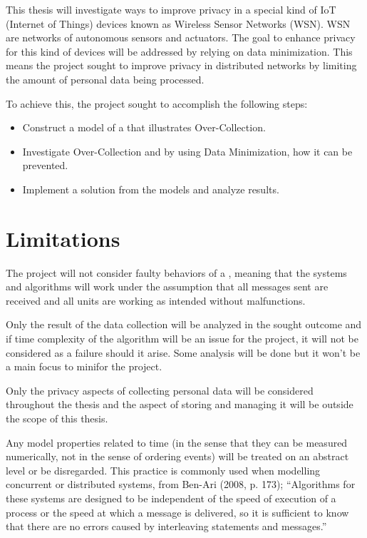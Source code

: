 This thesis will investigate ways to improve privacy in a special kind of IoT (Internet of Things) devices known as Wireless Sensor Networks (WSN). WSN are networks of autonomous sensors and actuators. The goal to enhance privacy for this kind of devices will be addressed by relying on data minimization. This means the project sought to improve privacy in distributed networks by limiting the amount of personal data being processed.

To achieve this, the project sought to accomplish the following steps:\\

\begin{itemize}
\setlength\itemsep{1em}
\item Construct a model of a \wsn that illustrates Over-Collection.
\item Investigate Over-Collection and by using Data Minimization, how it can be prevented. 
\item Implement a solution from the models and analyze results.
\end{itemize} 

\section{Limitations}


The project will not consider faulty behaviors of a \wsn, meaning that the systems and algorithms will work under the assumption that all messages sent are received and all units are working as intended without malfunctions.

Only the result of the data collection will be analyzed in the sought outcome and if time complexity of the algorithm will be an issue for the project, it will not be considered as a failure should it arise. Some analysis will be done but it won't be a main focus to minifor the project.

Only the privacy aspects of collecting personal data will be considered throughout the thesis and the aspect of storing and managing it will be outside the scope of this thesis.

Any model properties related to time (in the sense that they can be measured numerically, not in the sense of ordering events) will be treated on an abstract level or be disregarded. This practice is commonly used when modelling concurrent or distributed systems, from Ben-Ari (2008, p. 173); “Algorithms for these systems are designed to be independent of the speed of execution of a process or the speed at which a message is delivered, so it is sufficient to know that there are no errors caused by interleaving statements and messages.”


